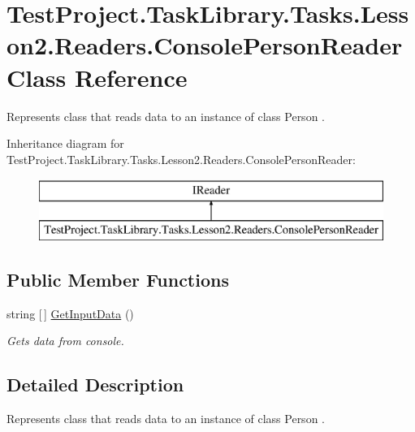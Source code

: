\hypertarget{class_test_project_1_1_task_library_1_1_tasks_1_1_lesson2_1_1_readers_1_1_console_person_reader}{}\section{Test\+Project.\+Task\+Library.\+Tasks.\+Lesson2.\+Readers.\+Console\+Person\+Reader Class Reference}
\label{class_test_project_1_1_task_library_1_1_tasks_1_1_lesson2_1_1_readers_1_1_console_person_reader}


Represents class that reads data to an instance of class Person .  


Inheritance diagram for Test\+Project.\+Task\+Library.\+Tasks.\+Lesson2.\+Readers.\+Console\+Person\+Reader\+:\begin{figure}[H]
\begin{center}
\leavevmode
\includegraphics[height=2.000000cm]{class_test_project_1_1_task_library_1_1_tasks_1_1_lesson2_1_1_readers_1_1_console_person_reader}
\end{center}
\end{figure}
\subsection*{Public Member Functions}
\begin{DoxyCompactItemize}
\item 
string \mbox{[}$\,$\mbox{]} \mbox{\hyperlink{class_test_project_1_1_task_library_1_1_tasks_1_1_lesson2_1_1_readers_1_1_console_person_reader_ad696a3ae882b5ea4de839d84e64b774f}{Get\+Input\+Data}} ()
\begin{DoxyCompactList}\small\item\em Gets data from console. \end{DoxyCompactList}\end{DoxyCompactItemize}


\subsection{Detailed Description}
Represents class that reads data to an instance of class Person . 




